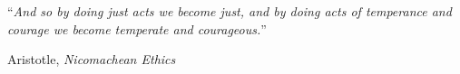 \documentclass[
11pt, %
english, %
singlespacing, %
headsepline, %
]{MastersDoctoralThesis} %
\begin{document}





\vspace*{0.2\textheight}

\noindent\enquote{\itshape And so by doing just acts we become just, and by doing acts of temperance and courage we become temperate and courageous.}\bigbreak

\hfill Aristotle, \textit{Nicomachean Ethics}

\end{document}
